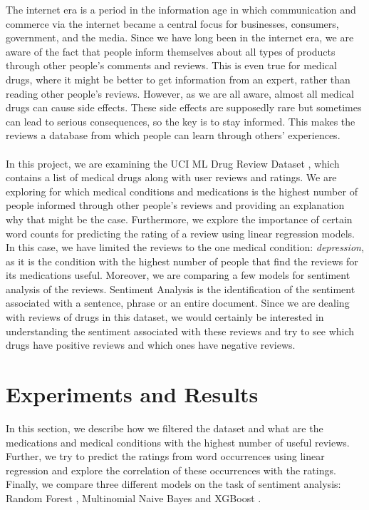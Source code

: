 \documentclass{article}
\begin{document}
The internet era is a period in the information age in which communication and commerce via the internet became a central focus for businesses, consumers, government, and the media. Since we have long been in the internet era, we are aware of the fact that people inform themselves about all types of products through other people's comments and reviews. This is even true for medical drugs, where it might be better to get information from an expert, rather than reading other people's reviews. However, as we are all aware, almost all medical drugs can cause side effects. These side effects are supposedly rare but sometimes can lead to serious consequences, so the key is to stay informed. This makes the reviews a database from which people can learn through others' experiences. \\
\\
In this project, we are examining the UCI ML Drug Review Dataset \citep{data}, which contains a list of medical drugs along with user reviews and ratings. We are exploring for which medical conditions and medications is the highest number of people informed through other people's reviews and providing an explanation why that might be the case. Furthermore, we explore the importance of certain word counts for predicting the rating of a review using linear regression models. In this case, we have limited the reviews to the one medical condition: \textit{depression}, as it is the condition with the highest number of people that find the reviews for its medications useful. Moreover, we are comparing a few models for sentiment analysis of the reviews. Sentiment Analysis is the identification of the sentiment associated with a sentence, phrase or an entire document. Since we are dealing with reviews of drugs in this dataset, we would certainly be interested in understanding the sentiment associated with these reviews and try to see which drugs have positive reviews and which ones have negative reviews.

\section{Experiments and Results}

In this section, we describe how we filtered the dataset and what are the medications and medical conditions with the highest number of useful reviews.  Further, we try to predict the ratings from word occurrences using linear regression and explore the correlation of these occurrences with the ratings. Finally, we compare three different models on the task of sentiment analysis:  Random Forest \citep{randomForest}, Multinomial Naive Bayes \citep{mnb} and XGBoost \citep{xgboost}.
\end{document}
